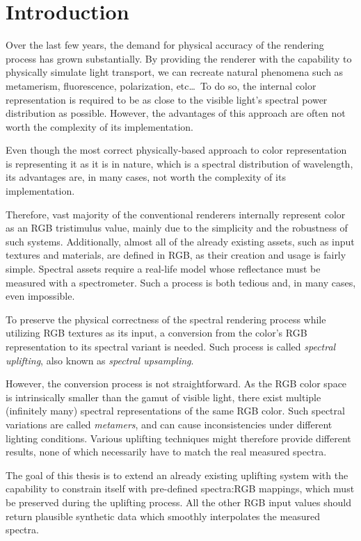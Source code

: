 \chapter*{Introduction}

Over the last few years, the demand for physical accuracy of the rendering process has grown substantially. By providing the renderer with the capability to physically simulate light transport, we can recreate natural phenomena such as metamerism, fluorescence, polarization, etc\ldots~To do so, the internal color representation is required to be as close to the visible light's spectral power distribution as possible. However, the advantages of this approach are often not worth the complexity of its implementation.

Even though the most correct physically-based approach to color representation is representing it as it is in nature, which is a spectral distribution of wavelength, its advantages are, in many cases, not worth the complexity of its implementation.

Therefore, vast majority of the conventional renderers internally represent color as an RGB tristimulus value, mainly due to the simplicity and the robustness of such systems. Additionally, almost all of the already existing assets, such as input textures and materials, are defined in RGB, as their creation and usage is fairly simple. Spectral assets require a real-life model whose reflectance must be measured with a spectrometer. Such a process is both tedious and, in many cases, even impossible.

To preserve the physical correctness of the spectral rendering process while utilizing RGB textures as its input, a conversion from the color's RGB representation to its spectral variant is needed. Such process is called \emph{spectral uplifting}, also known as \emph{spectral upsampling}.

However, the conversion process is not straightforward. As the RGB color space is intrinsically smaller than the gamut of visible light, there exist multiple (infinitely many) spectral representations of the same RGB color. Such spectral variations are called \emph{metamers}, and can cause inconsistencies under different lighting conditions. Various uplifting techniques might therefore provide different results, none of which necessarily have to match the real measured spectra.

The goal of this thesis is to extend an already existing uplifting system with the capability to constrain itself with pre-defined spectra:RGB mappings, which must be preserved during the uplifting process. All the other RGB input values should return plausible synthetic data which smoothly interpolates the measured spectra.
 
